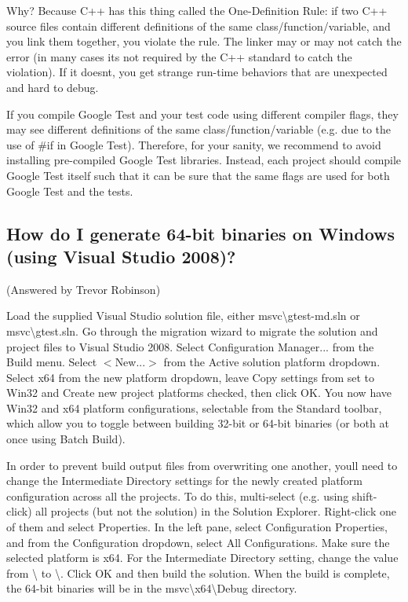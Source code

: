 Why? Because C++ has this thing called the One-\/Definition Rule\+: if two C++ source files contain different definitions of the same class/function/variable, and you link them together, you violate the rule. The linker may or may not catch the error (in many cases it\textquotesingle{}s not required by the C++ standard to catch the violation). If it doesn\textquotesingle{}t, you get strange run-\/time behaviors that are unexpected and hard to debug.

If you compile Google Test and your test code using different compiler flags, they may see different definitions of the same class/function/variable (e.\+g. due to the use of {\ttfamily \#if} in Google Test). Therefore, for your sanity, we recommend to avoid installing pre-\/compiled Google Test libraries. Instead, each project should compile Google Test itself such that it can be sure that the same flags are used for both Google Test and the tests.

\subsection*{How do I generate 64-\/bit binaries on Windows (using Visual Studio 2008)?}

(Answered by Trevor Robinson)

Load the supplied Visual Studio solution file, either {\ttfamily msvc\textbackslash{}gtest-\/md.\+sln} or {\ttfamily msvc\textbackslash{}gtest.\+sln}. Go through the migration wizard to migrate the solution and project files to Visual Studio 2008. Select {\ttfamily Configuration Manager...} from the {\ttfamily Build} menu. Select {\ttfamily $<$New...$>$} from the {\ttfamily Active solution platform} dropdown. Select {\ttfamily x64} from the new platform dropdown, leave {\ttfamily Copy settings from} set to {\ttfamily Win32} and {\ttfamily Create new project platforms} checked, then click {\ttfamily OK}. You now have {\ttfamily Win32} and {\ttfamily x64} platform configurations, selectable from the {\ttfamily Standard} toolbar, which allow you to toggle between building 32-\/bit or 64-\/bit binaries (or both at once using Batch Build).

In order to prevent build output files from overwriting one another, you\textquotesingle{}ll need to change the {\ttfamily Intermediate Directory} settings for the newly created platform configuration across all the projects. To do this, multi-\/select (e.\+g. using shift-\/click) all projects (but not the solution) in the {\ttfamily Solution Explorer}. Right-\/click one of them and select {\ttfamily Properties}. In the left pane, select {\ttfamily Configuration Properties}, and from the {\ttfamily Configuration} dropdown, select {\ttfamily All Configurations}. Make sure the selected platform is {\ttfamily x64}. For the {\ttfamily Intermediate Directory} setting, change the value from {\ttfamily \textbackslash{}} to {\ttfamily \textbackslash{}}. Click {\ttfamily OK} and then build the solution. When the build is complete, the 64-\/bit binaries will be in the {\ttfamily msvc\textbackslash{}x64\textbackslash{}Debug} directory.

